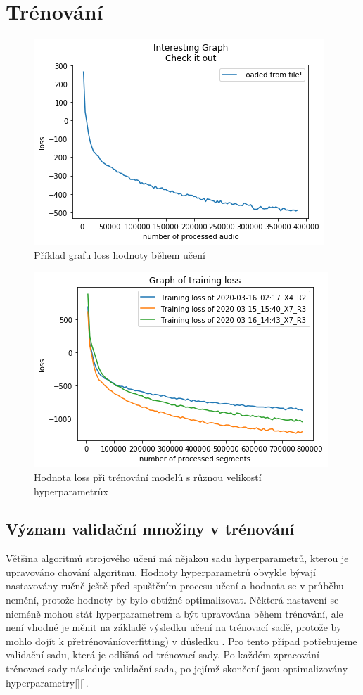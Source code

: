 \section{Trénování}
\begin{figure}[H]
    \centering
    \includegraphics[scale=0.55]{obrazky-figures/some-loss.png}
    \caption{\label{fig:somelossTODO}Příklad grafu loss hodnoty během učení}
\end{figure}

\begin{figure}[H]
    \centering
    \includegraphics[scale=0.55]{obrazky-figures/loss_triple.png}
    \caption{\label{fig:somelossTODO2}Hodnota loss při trénování modelů s různou velikostí hyperparametrůx}
\end{figure}

\subsection{Význam validační množiny v trénování}
Většina algoritmů strojového učení má nějakou sadu hyperparametrů, kterou je upravováno chování algoritmu. Hodnoty hyperparametrů obvykle bývají nastavovány ručně ještě před spuštěním procesu učení a hodnota se v průběhu nemění, protože hodnoty by bylo obtížné optimalizovat. 
Některá nastavení se nicméně mohou stát hyperparametrem a být upravována během trénování, ale není vhodné je měnit na základě výsledku učení na trénovací sadě, protože by mohlo dojít k přetrénováníoverfitting) v důsledku . Pro tento případ potřebujeme validační sadu, která je odlišná od trénovací sady.
Po každém zpracování trénovací sady následuje validační sada, po jejímž skončení jsou optimalizovány hyperparametry[][].

